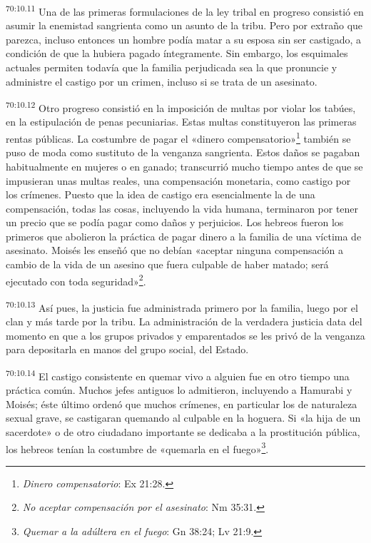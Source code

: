 \par
\textsuperscript{70:10.11} Una de las primeras formulaciones de la ley tribal en progreso consistió en asumir la enemistad sangrienta como un asunto de la tribu. Pero por extraño que parezca, incluso entonces un hombre podía matar a su esposa sin ser castigado, a condición de que la hubiera pagado íntegramente. Sin embargo, los esquimales actuales permiten todavía que la familia perjudicada sea la que pronuncie y administre el castigo por un crimen, incluso si se trata de un asesinato.

\par
\textsuperscript{70:10.12} Otro progreso consistió en la imposición de multas por violar los tabúes, en la estipulación de penas pecuniarias. Estas multas constituyeron las primeras rentas públicas. La costumbre de pagar el «dinero compensatorio»\footnote{\textit{Dinero compensatorio}: Ex 21:28.} también se puso de moda como sustituto de la venganza sangrienta. Estos daños se pagaban habitualmente en mujeres o en ganado; transcurrió mucho tiempo antes de que se impusieran unas multas reales, una compensación monetaria, como castigo por los crímenes. Puesto que la idea de castigo era esencialmente la de una compensación, todas las cosas, incluyendo la vida humana, terminaron por tener un precio que se podía pagar como daños y perjuicios. Los hebreos fueron los primeros que abolieron la práctica de pagar dinero a la familia de una víctima de asesinato. Moisés les enseñó que no debían «aceptar ninguna compensación a cambio de la vida de un asesino que fuera culpable de haber matado; será ejecutado con toda seguridad»\footnote{\textit{No aceptar compensación por el asesinato}: Nm 35:31.}.

\par
\textsuperscript{70:10.13} Así pues, la justicia fue administrada primero por la familia, luego por el clan y más tarde por la tribu. La administración de la verdadera justicia data del momento en que a los grupos privados y emparentados se les privó de la venganza para depositarla en manos del grupo social, del Estado.

\par
\textsuperscript{70:10.14} El castigo consistente en quemar vivo a alguien fue en otro tiempo una práctica común. Muchos jefes antiguos lo admitieron, incluyendo a Hamurabi y Moisés; éste último ordenó que muchos crímenes, en particular los de naturaleza sexual grave, se castigaran quemando al culpable en la hoguera. Si «la hija de un sacerdote» o de otro ciudadano importante se dedicaba a la prostitución pública, los hebreos tenían la costumbre de «quemarla en el fuego»\footnote{\textit{Quemar a la adúltera en el fuego}: Gn 38:24; Lv 21:9.}.

